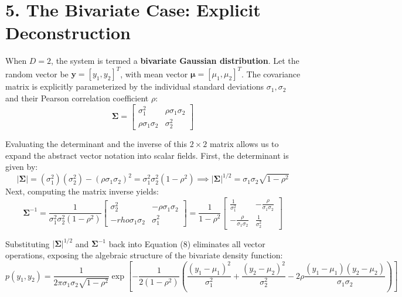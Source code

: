 \documentclass{article}
\begin{document}
\section*{5. The Bivariate Case: Explicit Deconstruction}

When $D = 2$, the system is termed a \textbf{bivariate Gaussian distribution}. Let the random vector be $\mathbf{y} = [y_1, y_2]^T$, with mean vector $\boldsymbol{\mu} = [\mu_1, \mu_2]^T$. The covariance matrix is explicitly parameterized by the individual standard deviations $\sigma_1, \sigma_2$ and their Pearson correlation coefficient $\rho$:
\begin{equation}
\boldsymbol{\Sigma} = \begin{bmatrix} \sigma_1^2 & \rho\sigma_1\sigma_2 \\ \rho\sigma_1\sigma_2 & \sigma_2^2 \end{bmatrix} \tag{9}
\end{equation}

Evaluating the determinant and the inverse of this $2 \times 2$ matrix allows us to expand the abstract vector notation into scalar fields. First, the determinant is given by:
\begin{equation*}
|\boldsymbol{\Sigma}| = (\sigma_1^2)(\sigma_2^2) - (\rho\sigma_1\sigma_2)^2 = \sigma_1^2\sigma_2^2(1 - \rho^2) \implies |\boldsymbol{\Sigma}|^{1/2} = \sigma_1\sigma_2\sqrt{1 - \rho^2}
\end{equation*}
Next, computing the matrix inverse yields:
\begin{equation*}
\boldsymbol{\Sigma}^{-1} = \frac{1}{\sigma_1^2\sigma_2^2(1 - \rho^2)} \begin{bmatrix} \sigma_2^2 & -\rho\sigma_1\sigma_2 \\ -rho\sigma_1\sigma_2 & \sigma_1^2 \end{bmatrix} = \frac{1}{1 - \rho^2} \begin{bmatrix} \frac{1}{\sigma_1^2} & -\frac{\rho}{\sigma_1\sigma_2} \\ -\frac{\rho}{\sigma_1\sigma_2} & \frac{1}{\sigma_2^2} \end{bmatrix}
\end{equation*}

Substituting $|\boldsymbol{\Sigma}|^{1/2}$ and $\boldsymbol{\Sigma}^{-1}$ back into Equation (8) eliminates all vector operations, exposing the algebraic structure of the bivariate density function:
\begin{equation}
p(y_1, y_2) = \frac{1}{2\pi\sigma_1\sigma_2\sqrt{1 - \rho^2}} \exp \left[ -\frac{1}{2(1 - \rho^2)} \left( \frac{(y_1 - \mu_1)^2}{\sigma_1^2} + \frac{(y_2 - \mu_2)^2}{\sigma_2^2} - 2\rho\frac{(y_1 - \mu_1)(y_2 - \mu_2)}{\sigma_1\sigma_2} \right) \right] \tag{10}
\end{equation}
\end{document}

